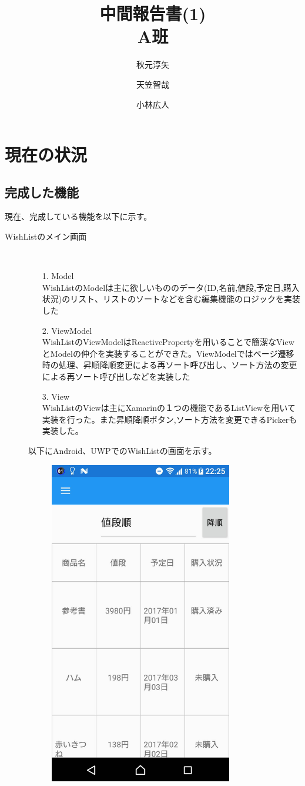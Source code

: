 \documentclass[a4j]{jarticle}
\title{中間報告書(1) \\ A班}
\author{秋元淳矢 \and 天笠智哉 \and 小林広人}
\date{}
\begin{document}
\maketitle

\section{現在の状況}
\subsection{完成した機能}
現在、完成している機能を以下に示す。
\begin{description}
	\item[WishListのメイン画面] \mbox{} \\
		\begin{itemize}
        	\item[1. Model] \ \\
            WishListのModelは主に欲しいもののデータ(ID,名前,値段,予定日,購入状況)のリスト、リストのソートなどを含む編集機能のロジックを実装した
            \item[2. ViewModel]\ \\
            WishListのViewModelはReactivePropertyを用いることで簡潔なViewとModelの仲介を実装することができた。ViewModelではページ遷移時の処理、昇順降順変更による再ソート呼び出し、ソート方法の変更による再ソート呼び出しなどを実装した
            \item[3. View] \ \\
            WishListのViewは主にXamarinの１つの機能であるListViewを用いて実装を行った。また昇順降順ボタン,ソート方法を変更できるPickerも実装した。
        \end{itemize}
        以下にAndroid、UWPでのWishListの画面を示す。
        \begin{figure}[h]
			\centering
 			\includegraphics[width=80mm]{figures/WishListMainAndroid.jpg} %

\end{figure}
\end{description}
\end{document}
